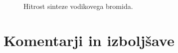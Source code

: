 \documentclass[a4paper]{article}
\begin{document}
\begin{figure}[H]
    \centering
    \caption{Hitrost sinteze vodikovega bromida.}
    \label{fig:br-heatmap}
\end{figure}



\section{Komentarji in izboljšave}

\newpage


\end{document}
